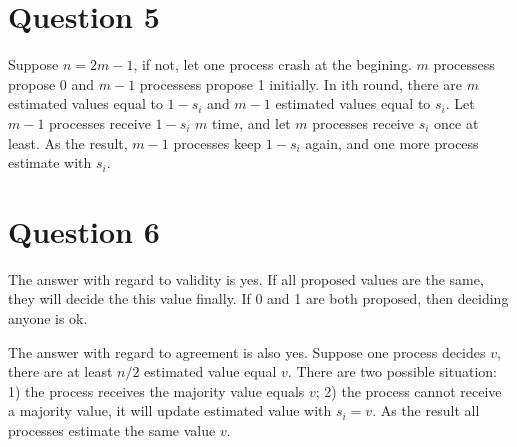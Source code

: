 \documentclass{article}
\begin{document}
\section*{Question 5}
Suppose $n=2m-1$, if not, let one process crash at the begining. $m$ processess propose 0 and $m-1$ processess propose 1 initially.
In ith round, there are $m$ estimated values equal to $1-s_i$ and $m-1$ estimated values equal to $s_i$. Let $m-1$ processes receive $1-s_i$ $m$ time, and let $m$ processes receive $s_i$ once at least. As the result, $m-1$ processes keep $1-s_i$ again, and one more process estimate with $s_i$.


\section*{Question 6}
The answer with regard to validity is yes. If all proposed values are the same, they will decide the this value finally. If 0 and 1 are both proposed, then deciding anyone is ok.

The answer with regard to agreement is also yes. Suppose one process decides $v$, there are at least $n/2$ estimated value equal $v$. There are two possible situation: 1) the process receives the majority value equals $v$; 2) the process cannot receive a majority value, it will update estimated value with $s_i=v$. As the result all processes estimate the same value $v$.
\end{document}

